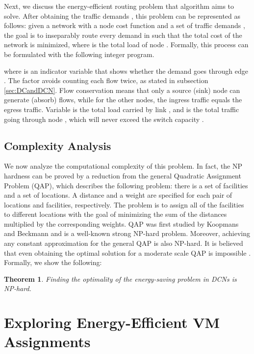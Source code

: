 \documentclass[journal,single-space,two column,twoside,10pt]{IEEEtran}
\newtheorem{theorem}{Theorem}
\begin{document}
Next, we discuss the energy-efficient routing problem that algorithm  aims to solve. After obtaining the traffic demands , this problem can be represented as follows: given a network  with a node cost function  and a set of traffic demands , the goal is to inseparably route every demand in  such that the total cost of the network  is minimized, where  is the total load of node . Formally, this process can be formulated with the following integer program.

where  is an indicator variable that shows whether the demand  goes through edge . The  factor avoids counting each flow twice, as stated in subsection \ref{sec:DCandDCN}. Flow conservation means that only a source (sink) node can generate (absorb) flows, while for the other nodes, the ingress traffic equals the egress traffic. Variable  is the total load carried by link , and  is the total traffic going through node , which will never exceed the switch capacity .



\subsection{Complexity Analysis}

We now analyze the computational complexity of this problem. In fact, the NP hardness can be proved by a reduction from the general Quadratic Assignment Problem (QAP), which describes the following problem: there is a set of  facilities and a set of  locations. A distance and a weight are specified for each pair of locations and facilities, respectively. The problem is to assign all of the facilities to different locations with the goal of minimizing the sum of the distances multiplied by the corresponding weights. QAP was first studied by Koopmans and Beckmann \cite{Koopmans_Beckmann-1957} and is a well-known strong NP-hard problem. Moreover, achieving any constant approximation for the general QAP is also NP-hard. It is believed that even obtaining the optimal solution for a moderate scale QAP is impossible \cite{Meng_Pappas-2010}. Formally, we show the following:

\begin{theorem}
Finding the optimality of the energy-saving problem in DCNs is NP-hard.
\end{theorem}


\section{Exploring Energy-Efficient VM Assignments}
\label{sec:assign}
\end{document}
